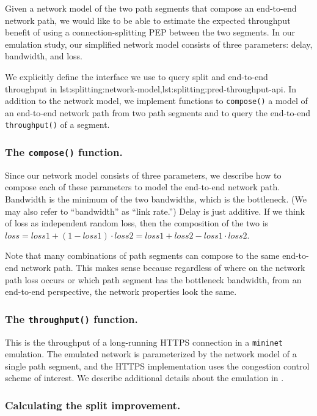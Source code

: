 


Given a network model of the two path segments that compose an end-to-end
network path, we would like to be able to estimate the expected throughput
benefit of using a connection-splitting PEP between the two segments. In our
emulation study, our simplified network model consists of three
parameters: delay, bandwidth, and loss.

We explicitly define the interface we
use to query split and end-to-end throughput in \Cref
{lst:splitting:network-model,lst:splitting:pred-throughput-api}. In addition
to the network model, we implement functions to \texttt{compose()} a model of
an end-to-end network path from two path segments and to
query the end-to-end \texttt{throughput()} of a segment.

\subsubsection{The \texttt{compose()} function.}
Since our network model consists of three parameters, we describe how to compose
each of these parameters to model the end-to-end network path. Bandwidth is the
minimum of the two bandwidths, which is the bottleneck.
(We may also refer to ``bandwidth'' as ``link rate.'')
Delay is just additive.
If we think of loss as independent random loss, then the composition
of the two is $loss = loss1 + (1-loss1)\cdot loss2 = loss1 + loss2 -
loss1 \cdot loss2$.

Note that many combinations of path segments can compose to the same end-to-end
network path. This makes sense because regardless of where on the network path
loss occurs or which path segment has the bottleneck bandwidth, from an
end-to-end perspective, the network properties look the same.

\subsubsection{The \texttt{throughput()} function.}
This is the throughput of a long-running HTTPS connection in a
\texttt{mininet} emulation. The emulated network is parameterized
by the network model of a single path segment, and the HTTPS implementation
uses the congestion control scheme of interest. We describe additional details
about the emulation in .

\subsubsection{Calculating the split improvement.}

